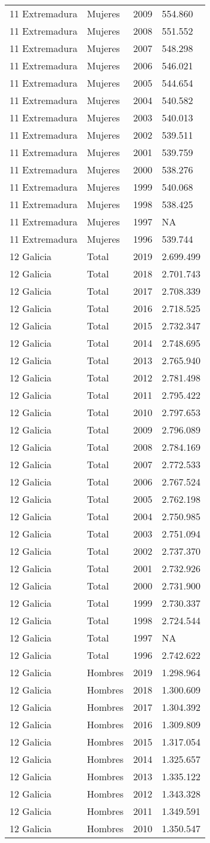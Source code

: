 \documentclass[
]{article}
\begin{document}
\begin{longtable}[]{@{}llrl@{}}
11 Extremadura & Mujeres & 2009 & 554.860\tabularnewline
11 Extremadura & Mujeres & 2008 & 551.552\tabularnewline
11 Extremadura & Mujeres & 2007 & 548.298\tabularnewline
11 Extremadura & Mujeres & 2006 & 546.021\tabularnewline
11 Extremadura & Mujeres & 2005 & 544.654\tabularnewline
11 Extremadura & Mujeres & 2004 & 540.582\tabularnewline
11 Extremadura & Mujeres & 2003 & 540.013\tabularnewline
11 Extremadura & Mujeres & 2002 & 539.511\tabularnewline
11 Extremadura & Mujeres & 2001 & 539.759\tabularnewline
11 Extremadura & Mujeres & 2000 & 538.276\tabularnewline
11 Extremadura & Mujeres & 1999 & 540.068\tabularnewline
11 Extremadura & Mujeres & 1998 & 538.425\tabularnewline
11 Extremadura & Mujeres & 1997 & NA\tabularnewline
11 Extremadura & Mujeres & 1996 & 539.744\tabularnewline
12 Galicia & Total & 2019 & 2.699.499\tabularnewline
12 Galicia & Total & 2018 & 2.701.743\tabularnewline
12 Galicia & Total & 2017 & 2.708.339\tabularnewline
12 Galicia & Total & 2016 & 2.718.525\tabularnewline
12 Galicia & Total & 2015 & 2.732.347\tabularnewline
12 Galicia & Total & 2014 & 2.748.695\tabularnewline
12 Galicia & Total & 2013 & 2.765.940\tabularnewline
12 Galicia & Total & 2012 & 2.781.498\tabularnewline
12 Galicia & Total & 2011 & 2.795.422\tabularnewline
12 Galicia & Total & 2010 & 2.797.653\tabularnewline
12 Galicia & Total & 2009 & 2.796.089\tabularnewline
12 Galicia & Total & 2008 & 2.784.169\tabularnewline
12 Galicia & Total & 2007 & 2.772.533\tabularnewline
12 Galicia & Total & 2006 & 2.767.524\tabularnewline
12 Galicia & Total & 2005 & 2.762.198\tabularnewline
12 Galicia & Total & 2004 & 2.750.985\tabularnewline
12 Galicia & Total & 2003 & 2.751.094\tabularnewline
12 Galicia & Total & 2002 & 2.737.370\tabularnewline
12 Galicia & Total & 2001 & 2.732.926\tabularnewline
12 Galicia & Total & 2000 & 2.731.900\tabularnewline
12 Galicia & Total & 1999 & 2.730.337\tabularnewline
12 Galicia & Total & 1998 & 2.724.544\tabularnewline
12 Galicia & Total & 1997 & NA\tabularnewline
12 Galicia & Total & 1996 & 2.742.622\tabularnewline
12 Galicia & Hombres & 2019 & 1.298.964\tabularnewline
12 Galicia & Hombres & 2018 & 1.300.609\tabularnewline
12 Galicia & Hombres & 2017 & 1.304.392\tabularnewline
12 Galicia & Hombres & 2016 & 1.309.809\tabularnewline
12 Galicia & Hombres & 2015 & 1.317.054\tabularnewline
12 Galicia & Hombres & 2014 & 1.325.657\tabularnewline
12 Galicia & Hombres & 2013 & 1.335.122\tabularnewline
12 Galicia & Hombres & 2012 & 1.343.328\tabularnewline
12 Galicia & Hombres & 2011 & 1.349.591\tabularnewline
12 Galicia & Hombres & 2010 & 1.350.547\tabularnewline

\end{longtable}
\end{document}

